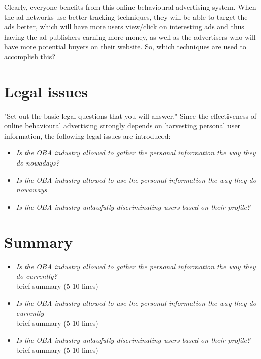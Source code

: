 \documentclass[11pt]{article}
\newcommand{\oba}{online behavioural advertising }
\begin{document}
Clearly, everyone benefits from this \oba system.
When the ad networks use better tracking techniques, they will be able to target the ads better, which will have more users view/click on interesting ads and thus having the ad publishers earning more money, as well as the advertisers who will have more potential buyers on their website.
So, which techniques are used to accomplish this?

\section{Legal issues}
"Set out the basic legal questions that you will answer."
Since the effectiveness of \oba strongly depends on harvesting personal user information, the following legal issues are introduced:\\

\begin{itemize}
	\item \textit{Is the OBA industry allowed to gather the personal information the way they do nowadays?}\\
	\item \textit{Is the OBA industry allowed to use the personal information the way they do nowaways}\\
	\item \textit{Is the OBA industry unlawfully discriminating users based on their profile?}\\
\end{itemize}

\section{Summary}
\begin{itemize}
	\item \textit{Is the OBA industry allowed to gather the personal information the way they do currently?}\\
			brief summary (5-10 lines)
	\item \textit{Is the OBA industry allowed to use the personal information the way they do currently}\\
			brief summary (5-10 lines)
	\item \textit{Is the OBA industry unlawfully discriminating users based on their profile?}\\
			brief summary (5-10 lines)
\end{itemize}
\end{document}
